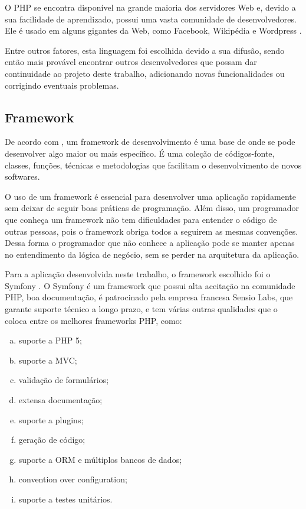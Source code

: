 O PHP se encontra disponível na grande maioria dos servidores Web e, devido a sua 
facilidade de aprendizado, possui uma vasta comunidade de desenvolvedores. Ele é 
usado em alguns gigantes da Web, como Facebook, Wikipédia e Wordpress \cite{InfoQ:Facebook, Wikipedia:Arquitetura, Wordpress}.

Entre outros fatores, esta linguagem foi escolhida devido a sua difusão, sendo então mais
provável encontrar outros desenvolvedores que possam dar continuidade ao projeto deste trabalho,
adicionando novas funcionalidades ou corrigindo eventuais problemas.

\subsection{Framework}
De acordo com \cite{Minetto}, um framework de desenvolvimento é uma base de onde se pode desenvolver 
algo maior ou mais específico. É uma coleção de códigos-fonte, classes, funções, técnicas e 
metodologias que facilitam o desenvolvimento de novos softwares.

O uso de um framework é essencial para desenvolver uma aplicação rapidamente sem deixar
de seguir boas práticas de programação. Além disso, um programador que conheça um
framework não tem dificuldades para entender o código de outras pessoas, pois o framework obriga todos 
a seguirem as mesmas convenções. Dessa forma o programador que não conhece a aplicação pode se
manter apenas no entendimento da lógica de negócio, sem se perder na arquitetura da aplicação.

Para a aplicação desenvolvida neste trabalho, o framework escolhido foi o Symfony \cite{symfony:about}. O Symfony é um 
framework que possui alta aceitação na comunidade PHP, boa documentação, é patrocinado pela 
empresa francesa Sensio Labs, que garante suporte técnico a longo prazo, e tem várias outras 
qualidades que o coloca entre os melhores frameworks PHP, como:

\begin{enumerate}[a.]
\item suporte a PHP 5;
\item suporte a MVC;
\item validação de formulários;
\item extensa documentação;
\item suporte a plugins;
\item geração de código;
\item suporte a ORM e múltiplos bancos de dados;
\item convention over configuration;
\item suporte a testes unitários.
\end{enumerate}

